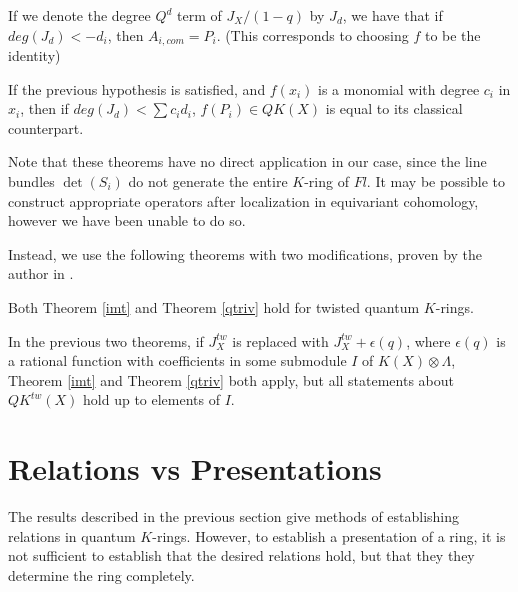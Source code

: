 \documentclass[11pt,letterpaper]{amsart}
\begin{document}
\begin{cor}
    If we denote the degree $Q^d$ term of $J_X/(1-q)$ by $J_d$, we have that if $deg(J_d)<-d_i$, then $A_{i,com}=P_i$. (This corresponds to choosing $f$ to be the identity)
\end{cor}

\begin{cor}
    If the previous hypothesis is satisfied, and $f(x_i)$ is a monomial with degree $c_i$ in $x_i$, then if $deg(J_d)<\sum c_id_i$, $f(P_i)\in QK(X)$ is equal to its classical counterpart.  
\end{cor}







Note that these theorems have no direct application in our case, since the line bundles $\det(S_{i})$ do not generate the entire $K$-ring of $Fl$. It may be possible to construct appropriate operators after localization in equivariant cohomology, however we have been unable to do so. 

Instead, we use the following theorems with two modifications, proven by the author in \cite{me}.

\begin{thm}[\cite{me}]
    Both Theorem \ref{imt} and Theorem \ref{qtriv} hold for twisted quantum $K$-rings. 
\end{thm}


\begin{thm}[\cite{me}]
    In the previous two theorems, if $J^{tw}_X$ is replaced with $J^{tw}_X+\epsilon(q)$, where $\epsilon(q)$ is a rational function with coefficients in some submodule $I$ of $K(X)\otimes \Lambda$, Theorem \ref{imt} and Theorem \ref{qtriv} both apply, but all statements about $QK^{tw}(X)$ hold up to elements of $I$. 
\end{thm}




\section{Relations vs Presentations}
The results described in the previous section give methods of establishing relations in quantum $K$-rings. However, to establish a presentation of a ring, it is not sufficient to establish that the desired relations hold, but that they they determine the ring completely. 
\end{document}
